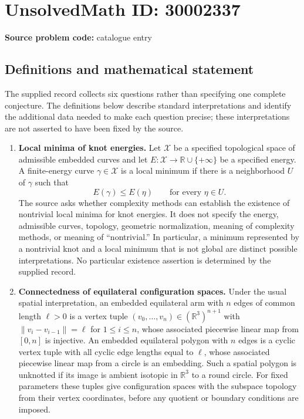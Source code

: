 \documentclass[11pt]{article}
\newcommand{\R}{\mathbb{R}}
\begin{document}
\section*{UnsolvedMath ID: 30002337}
\textbf{Source problem code:} catalogue entry
\subsection{Definitions and mathematical statement}
The supplied record collects six questions rather than specifying one complete conjecture. The definitions below describe standard interpretations and identify the additional data needed to make each question precise; these interpretations are not asserted to have been fixed by the source.

\begin{enumerate}
\item \textbf{Local minima of knot energies.} Let \(\mathcal X\) be a specified topological space of admissible embedded curves and let \(E:\mathcal X\to\R\cup\{+\infty\}\) be a specified energy. A finite-energy curve \(\gamma\in\mathcal X\) is a local minimum if there is a neighborhood \(U\) of \(\gamma\) such that
\[
E(\gamma)\leq E(\eta)\qquad\text{for every }\eta\in U.
\]
The source asks whether complexity methods can establish the existence of nontrivial local minima for knot energies. It does not specify the energy, admissible curves, topology, geometric normalization, meaning of complexity methods, or meaning of ``nontrivial.'' In particular, a minimum represented by a nontrivial knot and a local minimum that is not global are distinct possible interpretations. No particular existence assertion is determined by the supplied record.

\item \textbf{Connectedness of equilateral configuration spaces.} Under the usual spatial interpretation, an embedded equilateral arm with \(n\) edges of common length \(\ell>0\) is a vertex tuple \((v_0,\ldots,v_n)\in(\R^3)^{n+1}\) with \(\|v_i-v_{i-1}\|=\ell\) for \(1\leq i\leq n\), whose associated piecewise linear map from \([0,n]\) is injective. An embedded equilateral polygon with \(n\) edges is a cyclic vertex tuple with all cyclic edge lengths equal to \(\ell\), whose associated piecewise linear map from a circle is an embedding. Such a spatial polygon is unknotted if its image is ambient isotopic in \(\R^3\) to a round circle. For fixed parameters these tuples give configuration spaces with the subspace topology from their vertex coordinates, before any quotient or boundary conditions are imposed.


\end{enumerate}
\end{document}
